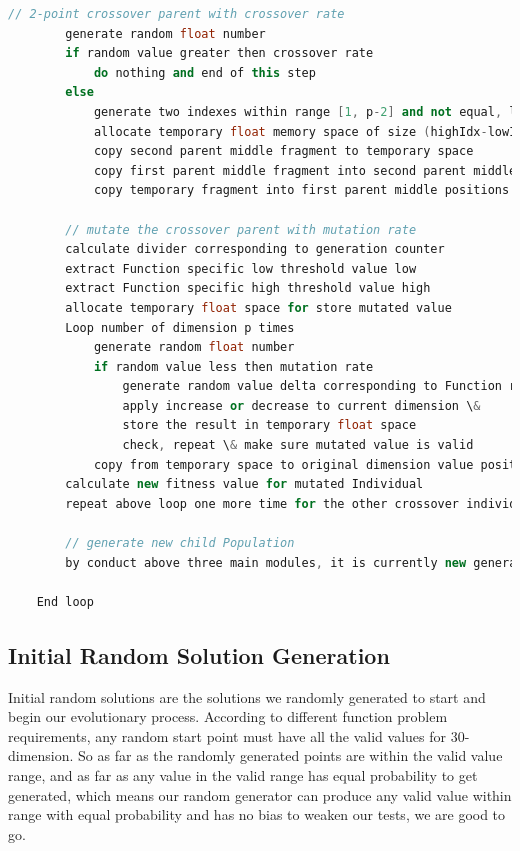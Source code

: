 \documentclass[10pt,b5paper]{article}
\begin{document}
\begin{lstlisting}[language=c++]
        // 2-point crossover parent with crossover rate
        generate random float number
        if random value greater then crossover rate
            do nothing and end of this step
        else
            generate two indexes within range [1, p-2] and not equal, lowIdx, highIdx
            allocate temporary float memory space of size (highIdx-lowIdx)
            copy second parent middle fragment to temporary space
            copy first parent middle fragment into second parent middle positions
            copy temporary fragment into first parent middle positions

        // mutate the crossover parent with mutation rate
        calculate divider corresponding to generation counter
        extract Function specific low threshold value low
        extract Function specific high threshold value high
        allocate temporary float space for store mutated value
        Loop number of dimension p times
            generate random float number
            if random value less then mutation rate
                generate random value delta corresponding to Function range and divider    
                apply increase or decrease to current dimension \&
                store the result in temporary float space
                check, repeat \& make sure mutated value is valid
            copy from temporary space to original dimension value position
        calculate new fitness value for mutated Individual    
        repeat above loop one more time for the other crossover individual

        // generate new child Population
        by conduct above three main modules, it is currently new generation already

    End loop
\end{lstlisting}
\subsection{Initial Random Solution Generation}
\label{sec-2-2}
Initial random solutions are the solutions we randomly generated to start and begin our evolutionary process. According to different function problem requirements, any random start point must have all the valid values for 30-dimension. So as far as the randomly generated points are within the valid value range, and as far as any value in the valid range has equal probability to get generated, which means our random generator can produce any valid value within range with equal probability and has no bias to weaken our tests, we are good to go.
\end{document}

